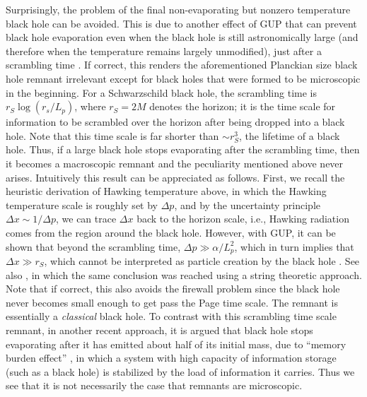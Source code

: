\documentclass[12pt,preprintnumbers, floatfix, preprintnumbers, letterpaper, superscriptaddress,nofootinbib]{revtex4-2}
\begin{document}
Surprisingly, the problem of the final non-evaporating but nonzero temperature black hole can be avoided. This is due to another effect of GUP that can prevent black hole evaporation even when the black hole is still astronomically large (and therefore when the temperature remains largely unmodified), just after a scrambling time \cite{2309.01638}. If correct, this renders the aforementioned Planckian size black hole remnant irrelevant except for black holes that were formed to be microscopic in the beginning.
For a Schwarzschild black hole, the scrambling time \cite{0708.4025,0808.2096} is $r_S\log(r_s/L_p)$, where $r_S=2M$ denotes the horizon; it is the time scale for information to be scrambled over the horizon after being dropped into a black hole. Note that this time scale is far shorter than $\sim r_S^3$, the lifetime of a black hole. Thus, if a large black hole stops evaporating after the scrambling time, then it becomes a macroscopic remnant and the peculiarity mentioned above never arises. Intuitively this result can be appreciated as follows. First, we recall the heuristic derivation of Hawking temperature above, in which the Hawking temperature scale is roughly set by $\Delta p$, and by the uncertainty principle $\Delta x \sim 1/\Delta p$, we can trace $\Delta x$ back to the horizon scale, i.e., Hawking radiation comes from the region around the black hole. However, with GUP, it can be shown that beyond the scrambling time, $\Delta p \gg \alpha/L_p^2$, which in turn implies that $\Delta x \gg r_S$, which cannot be interpreted as particle creation by the black hole \cite{2309.01638}. See also \cite{2309.12926}, in which the same conclusion was reached using a string theoretic approach. Note that if correct, this also avoids the firewall problem since the black hole never becomes small enough to get pass the Page time scale. The remnant is essentially a \emph{classical} black hole. To contrast with this scrambling time scale remnant,
in another recent approach, it is argued that black hole stops evaporating after it has emitted about half of its initial mass, due to ``memory burden effect'' \cite{2405.13117}, in which a system with high capacity of information storage (such as a black hole) is stabilized by the load of information it carries. Thus we see that it is not necessarily the case that remnants are microscopic.
\end{document}
